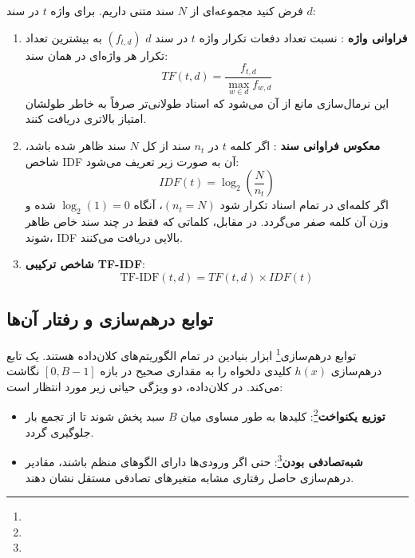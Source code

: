 فرض کنید مجموعه‌ای از $N$ سند متنی داریم. برای واژه $t$ در سند $d$:
\begin{enumerate}
    \item \textbf{فراوانی واژه }: نسبت تعداد دفعات تکرار واژه $t$ در سند $d$ $(f_{t,d})$ به بیشترین تعداد تکرار هر واژه‌ای در همان سند:
    \begin{equation}
    TF(t, d) = \frac{f_{t,d}}{\max_{w \in d} f_{w,d}}
    \end{equation}
    این نرمال‌سازی مانع از آن می‌شود که اسناد طولانی‌تر صرفاً به خاطر طولشان امتیاز بالاتری دریافت کنند.
    
    \item \textbf{معکوس فراوانی سند }: اگر کلمه $t$ در $n_t$ سند از کل $N$ سند ظاهر شده باشد، شاخص IDF آن به صورت زیر تعریف می‌شود:
    \begin{equation}
    IDF(t) = \log_2 \left( \frac{N}{n_t} \right)
    \end{equation}
    اگر کلمه‌ای در تمام اسناد تکرار شود $(n_t = N)$، آنگاه $\log_2(1) = 0$ شده و وزن آن کلمه صفر می‌گردد. در مقابل، کلماتی که فقط در چند سند خاص ظاهر شوند، IDF بالایی دریافت می‌کنند.
    
    \item \textbf{شاخص ترکیبی TF-IDF}:
    \begin{equation}
    \text{TF-IDF}(t, d) = TF(t, d) \times IDF(t)
    \end{equation}
\end{enumerate}

\subsection{توابع درهم‌سازی و رفتار آن‌ها}
توابع درهم‌سازی\footnote{} ابزار بنیادین در تمام الگوریتم‌های کلان‌داده هستند. یک تابع درهم‌سازی $h(x)$ کلیدی دلخواه را به مقداری صحیح در بازه $[0, B-1]$ نگاشت می‌کند. در کلان‌داده، دو ویژگی حیاتی زیر مورد انتظار است:
\begin{itemize}
    \item \textbf{توزیع یکنواخت}\footnote{}: کلیدها به طور مساوی میان $B$ سبد پخش شوند تا از تجمع بار جلوگیری گردد.
    \item \textbf{شبه‌تصادفی بودن}\footnote{}: حتی اگر ورودی‌ها دارای الگوهای منظم باشند، مقادیر درهم‌سازی حاصل رفتاری مشابه متغیرهای تصادفی مستقل نشان دهند.
\end{itemize}

